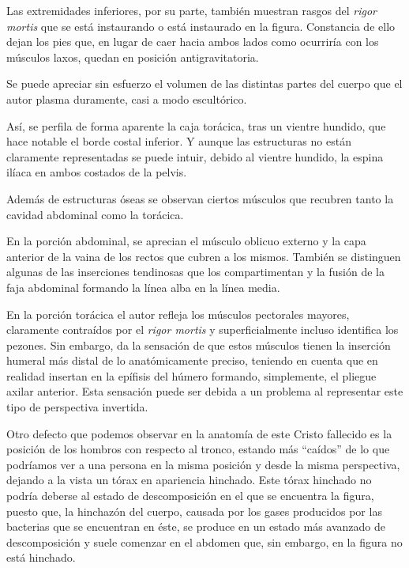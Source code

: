 Las extremidades inferiores, por su parte, también muestran rasgos del \textit{rigor mortis} que se está instaurando o está instaurado en la figura. Constancia de ello dejan los pies que, en lugar de caer hacia ambos lados como ocurriría con los músculos laxos, quedan en posición antigravitatoria.

Se puede apreciar sin esfuerzo el volumen de las distintas partes del cuerpo que el autor plasma duramente, casi a modo escultórico.

Así, se perfila de forma aparente la caja torácica, tras un vientre hundido, que hace notable el borde costal inferior. Y aunque las estructuras no están claramente representadas se puede intuir, debido al vientre hundido, la espina ilíaca en ambos costados de la pelvis.

Además de estructuras óseas se observan ciertos músculos que recubren tanto la cavidad abdominal como la torácica.

En la porción abdominal, %
se aprecian el músculo oblicuo externo y la capa anterior de la vaina de los rectos que cubren a los mismos. También se distinguen algunas de las inserciones tendinosas que los compartimentan y la fusión de la faja abdominal formando la línea alba en la línea media.

En la porción torácica el autor refleja los músculos pectorales mayores, claramente contraídos por el \textit{rigor mortis} y superficialmente incluso identifica los pezones. Sin embargo, da la sensación de que estos músculos tienen la inserción humeral más distal de lo anatómicamente preciso, teniendo en cuenta que en realidad insertan en la epífisis del húmero formando, simplemente, el pliegue axilar anterior. Esta sensación puede ser debida a un problema al representar este tipo de perspectiva invertida. 

Otro defecto que podemos observar en la anatomía de este Cristo fallecido es la posición de los hombros con respecto al tronco, estando más ``caídos'' de lo que podríamos ver a una persona en la misma posición y desde la misma perspectiva, dejando a la vista un tórax en apariencia hinchado. Este tórax hinchado no podría deberse al estado de descomposición en el que se encuentra la figura, puesto que, la hinchazón del cuerpo, causada por los gases producidos por las bacterias que se encuentran en éste, se produce en un estado más avanzado de descomposición y suele comenzar en el abdomen que, sin embargo, en la figura no está hinchado.


